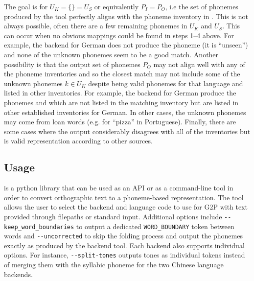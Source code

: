 The goal is for $U_K = \{\} = U_S$ or equivalently $P_I = P_O$, i.e the set of phonemes produced by the tool perfectly aligns with the phoneme inventory in \phoible. This is not always possible, often there are a few remaining phonemes in $U_K$ and $U_S$. This can occur when no obvious mappings could be found in steps 1--4 above. For example, the \epitran backend for German does not produce the phoneme  (it is ``unseen'') and none of the unknown phonemes seem to be a good match. Another possibility is that the output set of phonemes $P_O$ may not align well with any of the \phoible phoneme inventories and so the closest match may not include some of the unknown phonemes $k \in U_K$ despite being valid phonemes for that language and listed in other inventories. For example, the \epitran backend for German produce the phonemes  and  which are not listed in the matching inventory but are listed in other established inventories for German. In other cases, the unknown phonemes may come from loan words (e.g.  for ``pizza'' in Portuguese). Finally, there are some cases where the output considerably disagrees with all of the \phoible inventories but is valid representation according to other sources.

\subsection{Usage}\label{sec:13-usage}

\gpp is a python library that can be used as an API or as a command-line tool in order to convert orthographic text to a phoneme-based representation. The tool allows the user to select the backend and language code to use for G2P with text provided through filepaths or standard input. Additional options include \verb|--keep_word_boundaries| to output a dedicated \texttt{WORD\_BOUNDARY} token between words and \verb|--uncorrected| to skip the folding process and output the phonemes exactly as produced by the backend tool. Each backend also supports individual options. For instance, \verb|--split-tones| outputs tones as individual tokens instead of merging them with the syllabic phoneme for the two Chinese language backends. 





